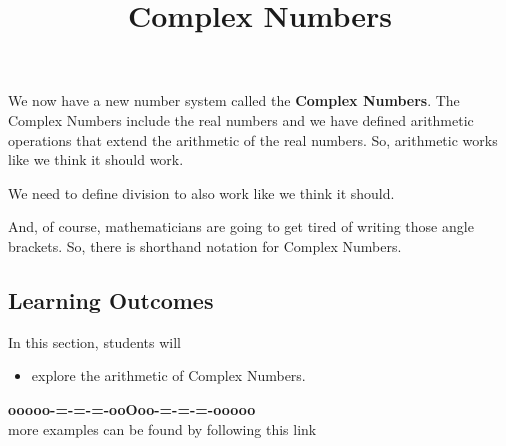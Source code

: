 \documentclass{ximera}
\title{Complex Numbers}
\begin{document}
\begin{abstract}
\end{abstract}
\maketitle







We now have a new number system called the \textbf{Complex Numbers}.  The Complex Numbers include the real numbers and we have defined arithmetic operations that extend the arithmetic of the real numbers.  So, arithmetic works like we think it should work.

We need to define division to also work like we think it should.  


And, of course, mathematicians are going to get tired of writing those angle brackets.  So, there is shorthand notation for Complex Numbers.





\subsection*{Learning Outcomes}

\begin{sectionOutcomes}
In this section, students will 

\begin{itemize}
\item explore the arithmetic of Complex Numbers.
\end{itemize}
\end{sectionOutcomes}











\begin{center}
\textbf{\textcolor{green!50!black}{ooooo-=-=-=-ooOoo-=-=-=-ooooo}} \\

more examples can be found by following this link\\ 

\end{center}
\end{document}
